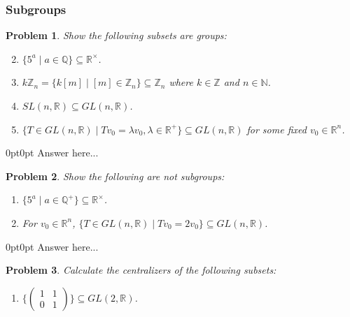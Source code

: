 \documentclass[12pt]{article}
\newtheorem{problem}{Problem}
\numberwithin{problem}{section} %
\theoremstyle{remark}  %
\newenvironment{answer}
    {\begin{adjustwidth}{0pt}{0pt}}
    {\end{adjustwidth}}
\begin{document}
\subsubsection{Subgroups}
\setcounter{problem}{52}
    \begin{problem}
        Show the following subsets are groups:
        \begin{enumerate}[label=(\alph*)]
            \setcounter{enumi}{1}
            \item $\{5^a\mid a \in \mathbb{Q}\} \subseteq \mathbb{R}^\times$.
            \item $k\mathbb{Z}_n=\{k[m]\mid[m]\in\mathbb{Z}_n\}\subseteq \mathbb{Z}_n$ where $k\in \mathbb{Z}$ and $n\in\mathbb{N}$.
            \setcounter{enumi}{6}
            \item $SL(n,\mathbb{R})\subseteq GL(n,\mathbb{R})$.
            \item $\{T \in GL(n,\mathbb{R}) \mid Tv_0=\lambda v_0, \lambda \in \mathbb{R}^{+}\} \subseteq GL(n,\mathbb{R})$ for some fixed $v_0\in \mathbb{R}^n$.
        \end{enumerate}
    \end{problem}
    \begin{answer}
        Answer here...
    \end{answer}
    \begin{problem}
        Show the following are not subgroups:
        \begin{enumerate}[label=(\alph*)]
            \item $\{5^a \mid a \in \mathbb{Q}^+\} \subseteq \mathbb{R}^\times$.
            \setcounter{enumi}{4}
            \item For $v_0\in \mathbb{R}^n$, $\{T \in GL(n,\mathbb{R}) \mid Tv_0=2v_0\} \subseteq GL(n,\mathbb{R})$.
        \end{enumerate}
    \end{problem}
    \begin{answer}
        Answer here...
    \end{answer}
    \begin{problem}
        Calculate the centralizers of the following subsets:
        \begin{enumerate}[label=(\alph*)]
            \item $\{\begin{pmatrix}
                1 & 1 \\
                0 & 1
            \end{pmatrix}\} \subseteq GL(2,\mathbb{R})$.
        \end{enumerate}
    \end{problem}
\end{document}
